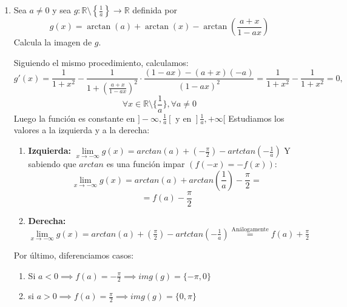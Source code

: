 \documentclass[12pt]{article}
\begin{document}
\begin{ejercicio}
\begin{enumerate}[label=\alph*)]
\begin{center}
    \end{center}
    
     \item Sea $a\neq 0$ y sea $g:\mathbb{R}\setminus \left\{\frac{1}{a}\right\}\longrightarrow \mathbb{R}$ definida por
                \begin{equation*}
                    g(x) = \arctan(a) + \arctan(x) - \arctan\left(\dfrac{a+x}{1-ax}\right)
                \end{equation*}
                Calcula la imagen de $g$.

    Siguiendo el mismo procedimiento, calculamos: $$g'(x) = \frac1{1+x^2}-\frac{1}{1 + \left( \frac{a + x}{1 - ax} \right)^2} \cdot 
\frac{(1 - ax) - (a + x)(-a)}{(1 - ax)^2} = \frac1{1+x^2}-\frac1{1+x^2} = 0,$$$$ \forall x \in \mathbb{R}\setminus\{\frac 1a\}, \forall a \neq0$$
Luego la función es constante en $]-\infty,\frac 1a[ \text{ y en } ]\frac 1a, +\infty[$
\newline
Estudiamos los valores a la izquierda y a la derecha:
\begin{enumerate}
    \item \textbf{Izquierda: } $\underset{x\to-\infty}\lim{g(x)}=arctan(a) + (-\frac\pi2) - artctan(-\frac1a)$ \newline Y sabiendo que $arctan$ es una función impar $(f(-x) = -f(x))$: $$\underset{x\to-\infty}\lim{g(x)}=arctan(a)+arctan(\frac 1a) - \frac \pi2 =$$ $$ = f(a) - \frac \pi2$$
    \item \textbf{Derecha: } $\underset{x\to-\infty}\lim{g(x)}=arctan(a) + (\frac\pi2) - artctan(-\frac1a) \overset{\text{Análogamente}}{=} f(a) +\frac \pi2$ 
\end{enumerate}
Por último, diferenciamos casos:
\begin{enumerate}
    \item Si $a<0 \implies f(a) = -\frac\pi2 \implies img(g) = \{-\pi,0\}$
    \item si $a>0 \implies f(a) = \frac\pi2 \implies img(g) = \{0, \pi\}$
\end{enumerate}
\end{enumerate}
\end{ejercicio}
\end{document}
